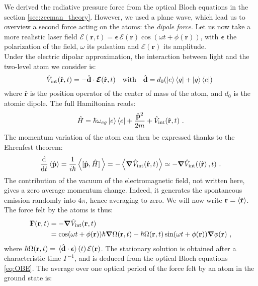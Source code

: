 \documentclass[11pt]{article}
\numberwithin{equation}{section}
\numberwithin{figure}{section}
\begin{document}
We derived the radiative pressure force from the optical Bloch equations in the section \ref{sec:zeeman_theory}. However, we used a plane wave, which lead us to overview a second force acting on the atoms: the \emph{dipole force}. Let us now take a more realistic laser field $\bm{\mathcal{E}}(\mathbf{r}, t) = \bm{\epsilon} \,\mathcal{E}(\mathbf{r}) \cos(\omega t + \phi(\mathbf{r}))$, with $\bm{\epsilon}$ the polarization of the field, $\omega$ its pulsation and $\mathcal{E}(\mathbf{r})$ its amplitude. \\
Under the electric dipolar approximation, the interaction between light and the two-level atom we consider is:
%
\begin{equation}
	\hat{V}_\text{int}(\hat{\mathbf{r}}, t) = -  \hat{\mathbf{d}} \cdot \bm{\mathcal{E}}(\hat{\mathbf{r}}, t) \qq{with}   \hat{\mathbf{d}} = d_0 (\ket{e}\bra{g} + \ket{g} \bra{e})~
\end{equation}
%
where $\hat{\mathbf{r}}$ is the position operator of the center of mass of the atom, and $d_0$ is the atomic dipole. The full Hamiltonian reads:
%
\begin{equation}
	\hat{H} = \hbar \omega_{eg} \ket{e}\bra{e} + \frac{\hat{\mathbf{p}}^2}{2m} + \hat{V}_\text{int}(\hat{\mathbf{r}}, t)~.
\end{equation}
%
 The momentum variation of the atom can then be expressed thanks to the Ehrenfest theorem:
%
\begin{equation}
	\dv{t} \expval*{\hat{\mathbf{p}}} = \frac{1}{i \hbar} \expval{\comm*{\hat{\mathbf{p}}}{\hat{H}}} = - \expval{\grad \hat{V}_\text{int}(\hat{\mathbf{r}}, t)} \simeq - \grad \hat{V}_\text{int}(\expval{\hat{\mathbf{r}}}, t)~.
\end{equation}
%
The contribution of the vacuum of the electromagnetic field, not written here, gives a zero average momentum change. Indeed, it generates the spontaneous emission randomly into $4 \pi$, hence averaging to zero. We will now write $\mathbf{r} = \expval{\hat{\mathbf{r}}}$. The force felt by the atoms is thus:
%
\begin{align}
	\mathbf{F}(\mathbf{r}, t) &= - \grad \hat{V}_\text{int}(\mathbf{r}, t) \\
															 &=  \cos(\omega t + \phi(\mathbf{r})) \hbar \grad \Omega (\mathbf{r}, t) - \hbar \Omega (\mathbf{r}, t) \sin(\omega t + \phi(\mathbf{r})) \grad \phi(\mathbf{r}) ~,
\end{align}
%
where $\hbar \Omega (\mathbf{r}, t)  = \expval*{ \hat{\mathbf{d}}  \cdot \bm{\epsilon}}(t) \,\mathcal{E}(\mathbf{r})$. The stationary solution is obtained after a characteristic time $\Gamma^{-1}$, and is deduced from the optical Bloch equations \eqref{eq:OBE}. The average over one optical period of the force felt by an atom in the ground state is:
\end{document}
